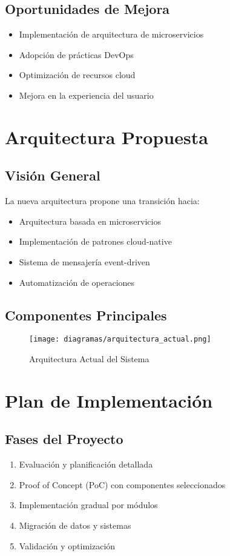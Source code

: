 \documentclass[12pt,a4paper]{article}
\begin{document}
\subsection{Oportunidades de Mejora}
\begin{itemize}
    \item Implementación de arquitectura de microservicios
    \item Adopción de prácticas DevOps
    \item Optimización de recursos cloud
    \item Mejora en la experiencia del usuario
\end{itemize}

\section{Arquitectura Propuesta}
\subsection{Visión General}
La nueva arquitectura propone una transición hacia:
\begin{itemize}
    \item Arquitectura basada en microservicios
    \item Implementación de patrones cloud-native
    \item Sistema de mensajería event-driven
    \item Automatización de operaciones
\end{itemize}

\subsection{Componentes Principales}
\begin{figure}[H]
    \centering
    \texttt{[image: diagramas/arquitectura\_actual.png]}
    \caption{Arquitectura Actual del Sistema}
    \label{fig:arq-actual}
\end{figure}

\section{Plan de Implementación}
\subsection{Fases del Proyecto}
\begin{enumerate}
    \item Evaluación y planificación detallada
    \item Proof of Concept (PoC) con componentes seleccionados
    \item Implementación gradual por módulos
    \item Migración de datos y sistemas
    \item Validación y optimización
\end{enumerate}
\end{document}
